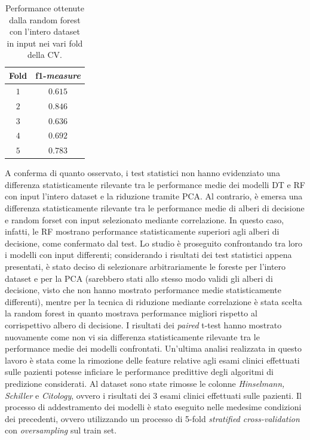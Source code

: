 \begin{table}
	\centering
	\caption{Performance ottenute dalla random forest con l'intero dataset in input nei vari fold della CV.}
	\label{tab:f1fold}
	\begin{tabular}{|c|c|}
		\hline 
		Fold & f1-\textit{measure} \\ 
		\hline 
		$1$ & $0.615$ \\ 
		\hline 
		$2$ & $0.846$ \\ 
		\hline 
		$3$ & $0.636$ \\ 
		\hline 
		$4$ & $0.692$ \\ 
		\hline 
		$5$ & $0.783$ \\ 
		\hline 
	\end{tabular} 
\end{table}
A conferma di quanto osservato, i test statistici non hanno evidenziato una differenza statisticamente rilevante tra le performance medie dei modelli DT e RF con input l'intero dataset e la riduzione tramite PCA. Al contrario, è emersa una differenza statisticamente rilevante tra le performance medie di alberi di decisione e random forset con input selezionato mediante correlazione. In questo caso, infatti, le RF mostrano performance statisticamente superiori agli alberi di decisione, come confermato dal test.
Lo studio è proseguito confrontando tra loro i modelli con input differenti; considerando i risultati dei test statistici appena presentati, è stato deciso di selezionare arbitrariamente le foreste per l'intero dataset e per la PCA (sarebbero stati allo stesso modo validi gli alberi di decisione, visto che non hanno mostrato performance medie statisticamente differenti), mentre per la tecnica di riduzione mediante correlazione è stata scelta la random forest in quanto mostrava performance migliori rispetto al corrispettivo albero di decisione. I risultati dei \textit{paired} t-test hanno mostrato nuovamente come non vi sia differenza statisticamente rilevante tra le performance medie dei modelli confrontati.
Un'ultima analisi realizzata in questo lavoro è stata come la rimozione delle feature relative agli esami clinici effettuati sulle pazienti potesse inficiare le performance predittive degli algoritmi di predizione considerati. Al dataset sono state rimosse le colonne \textit{Hinselmann, Schiller} e \textit{Citology}, ovvero i risultati dei 3 esami clinici effettuati sulle pazienti. Il processo di addestramento dei modelli è stato eseguito nelle medesime condizioni dei precedenti, ovvero utilizzando un processo di 5-fold \textit{stratified cross-validation} con \textit{oversampling} sul train set.
